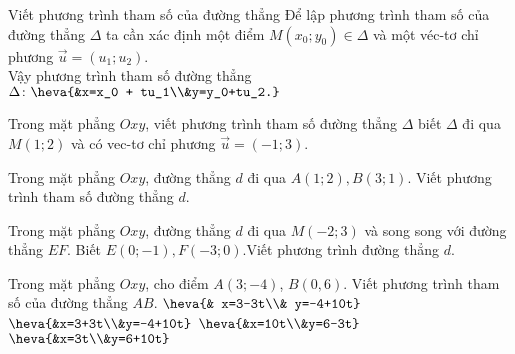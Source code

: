 \begin{dang}{Viết phương trình tham số của đường thẳng}
	Để lập phương trình tham số của đường thẳng $\Delta$ ta cần xác định một điểm $M \left(x_0; y_0 \right) \in \Delta$ và một véc-tơ chỉ phương $ \overrightarrow{u} = \left(u_1; u_2 \right)$.\\
	Vậy phương trình tham số đường thẳng $\Delta \colon \heva{&x=x_0 + tu_1\\&y=y_0+tu_2.}$
\end{dang}
\viduminhhoa
\begin{vd}%
	Trong mặt phẳng $Oxy$, viết phương trình tham số đường thẳng $\Delta$ biết $\Delta$ đi qua $M(1;2)$ và có vec-tơ chỉ phương $ \overrightarrow{u} = (-1;3)$.
\end{vd}
\begin{vd}%
	Trong mặt phẳng $Oxy$, đường thẳng $d$ đi qua $A \left(1; 2 \right), B \left(3;1 \right)$. Viết phương trình tham số đường thẳng $d$.
\end{vd}
\begin{vd}%
	Trong mặt phẳng $Oxy$, đường thẳng $d$ đi qua $M(-2;3)$ và song song với đường thẳng $EF$. Biết $E(0;-1), F(-3;0)$.Viết phương trình đường thẳng $d$.
\end{vd}
\baitaptl   

\begin{ex}%
	Trong mặt phẳng $Oxy$, cho điểm $A (3;-4)$, $B(0,6)$. Viết phương trình tham số của đường thẳng $AB$.
	\choice
	{\True $\heva{& x=3-3t\\& y=-4+10t}$}
	{$\heva{&x=3+3t\\&y=-4+10t}$}
	{$\heva{&x=10t\\&y=6-3t}$}
	{$\heva{&x=3t\\&y=6+10t}$}
\end{ex}

